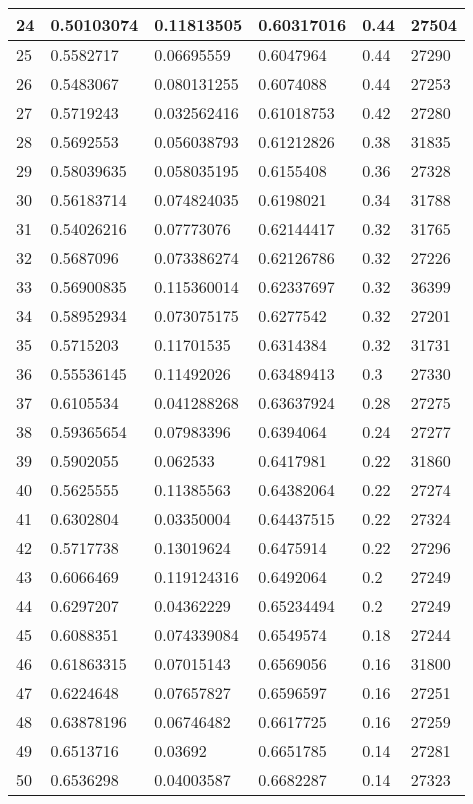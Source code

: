 \begin{longtable}{|l|l|l|l|l|l|}
24 & 0.50103074 & 0.11813505 & 0.60317016 & 0.44 & 27504 \\ \hline 
25 & 0.5582717 & 0.06695559 & 0.6047964 & 0.44 & 27290 \\ \hline 
26 & 0.5483067 & 0.080131255 & 0.6074088 & 0.44 & 27253 \\ \hline 
27 & 0.5719243 & 0.032562416 & 0.61018753 & 0.42 & 27280 \\ \hline 
28 & 0.5692553 & 0.056038793 & 0.61212826 & 0.38 & 31835 \\ \hline 
29 & 0.58039635 & 0.058035195 & 0.6155408 & 0.36 & 27328 \\ \hline 
30 & 0.56183714 & 0.074824035 & 0.6198021 & 0.34 & 31788 \\ \hline 
31 & 0.54026216 & 0.07773076 & 0.62144417 & 0.32 & 31765 \\ \hline 
32 & 0.5687096 & 0.073386274 & 0.62126786 & 0.32 & 27226 \\ \hline 
33 & 0.56900835 & 0.115360014 & 0.62337697 & 0.32 & 36399 \\ \hline 
34 & 0.58952934 & 0.073075175 & 0.6277542 & 0.32 & 27201 \\ \hline 
35 & 0.5715203 & 0.11701535 & 0.6314384 & 0.32 & 31731 \\ \hline 
36 & 0.55536145 & 0.11492026 & 0.63489413 & 0.3 & 27330 \\ \hline 
37 & 0.6105534 & 0.041288268 & 0.63637924 & 0.28 & 27275 \\ \hline 
38 & 0.59365654 & 0.07983396 & 0.6394064 & 0.24 & 27277 \\ \hline 
39 & 0.5902055 & 0.062533 & 0.6417981 & 0.22 & 31860 \\ \hline 
40 & 0.5625555 & 0.11385563 & 0.64382064 & 0.22 & 27274 \\ \hline 
41 & 0.6302804 & 0.03350004 & 0.64437515 & 0.22 & 27324 \\ \hline 
42 & 0.5717738 & 0.13019624 & 0.6475914 & 0.22 & 27296 \\ \hline 
43 & 0.6066469 & 0.119124316 & 0.6492064 & 0.2 & 27249 \\ \hline 
44 & 0.6297207 & 0.04362229 & 0.65234494 & 0.2 & 27249 \\ \hline 
45 & 0.6088351 & 0.074339084 & 0.6549574 & 0.18 & 27244 \\ \hline 
46 & 0.61863315 & 0.07015143 & 0.6569056 & 0.16 & 31800 \\ \hline 
47 & 0.6224648 & 0.07657827 & 0.6596597 & 0.16 & 27251 \\ \hline 
48 & 0.63878196 & 0.06746482 & 0.6617725 & 0.16 & 27259 \\ \hline 
49 & 0.6513716 & 0.03692 & 0.6651785 & 0.14 & 27281 \\ \hline 
50 & 0.6536298 & 0.04003587 & 0.6682287 & 0.14 & 27323 \\ \hline 
\end{longtable}